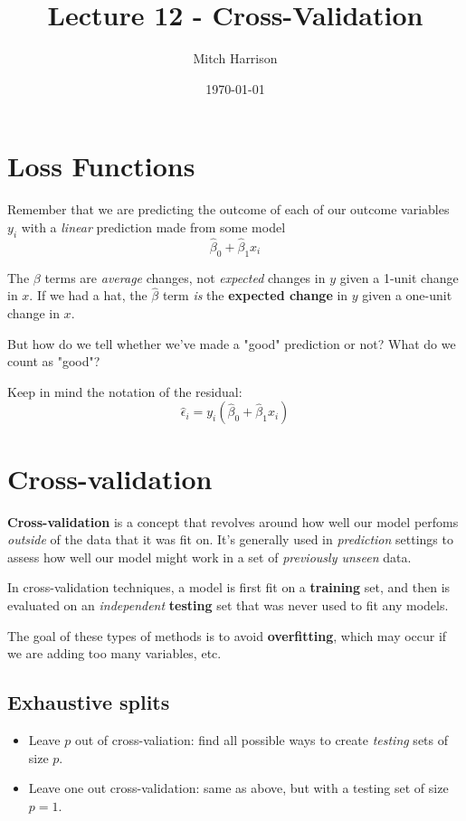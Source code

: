 \documentclass[titlepage, 12pt, leqno]{article}
\title{\Huge{Lecture 12 - Cross-Validation}}
\author{\large{Mitch Harrison}}
\date{\today}
\begin{document}
\setlength{\parskip}{1\baselineskip}
\setlength{\parindent}{15pt}
\maketitle
\tableofcontents
\newpage


\section{Loss Functions}

Remember that we are predicting the outcome of each of our outcome variables $y_i$
with a \textit{linear} prediction made from some model
\[
\hat \beta_0 + \hat \beta_1x_i
\]
\begin{note}
    The $\beta$ terms are \textit{average} changes, not \textit{expected}
    changes in $y$ given a 1-unit change in $x$. If we had a hat, the $\hat 
    \beta$ term \textit{is} the \textbf{expected change} in $y$ given a one-unit
    change in $x$.
\end{note}

But how do we tell whether we've made a "good" prediction or not? What do we count
as "good"?

Keep in mind the notation of the residual:
\[
\hat \epsilon_i = y_i (\hat \beta_0 + \hat \beta_1 x_i)
\]
\pagebreak
\section{Cross-validation}
\begin{definition}
    \textbf{Cross-validation} is a concept that revolves around how well our model
    perfoms \textit{outside} of the data that it was fit on. It's generally used
    in \textit{prediction} settings to assess how well our model might work in a
    set of \textit{previously unseen} data.
\end{definition}

In cross-validation techniques, a model is first fit on a \textbf{training} set,
and then is evaluated on an \textit{independent} \textbf{testing} set that was
never used to fit any models.

The goal of these types of methods is to avoid \textbf{overfitting}, which may
occur if we are adding too many variables, etc.

\subsection{Exhaustive splits}
\begin{itemize}
    \item Leave $p$ out of cross-valiation: find all possible ways to create
        \textit{testing} sets of size $p$.
    \item Leave one out cross-validation: same as above, but with a testing set of
        size $p=1$.
\end{itemize}
\end{document}
